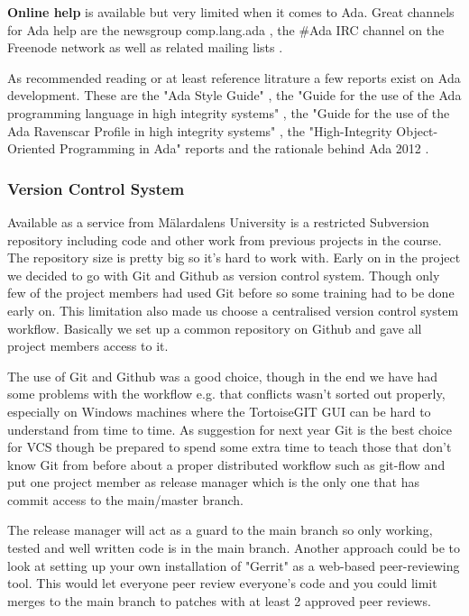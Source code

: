 \textbf{Online help} is available but very limited when it comes to Ada. Great
channels for Ada help are the newsgroup comp.lang.ada \cite{web:comp.lang.ada},
the \#Ada IRC channel on the Freenode network as well as related mailing lists
\cite{web:avr-ada-devel,web:debian-ada-devel}.

As recommended reading or at least reference litrature a few reports
exist on Ada development. These are the "Ada Style Guide" \cite{web:wikibooks-ada-style-guide},
the "Guide for the use of the Ada programming language in high integrity systems"
\cite{web:ada-high-integrity}, the "Guide for the use of the Ada Ravenscar Profile
in high integrity systems" \cite{web:ada-ravenscar-high-integrity}, the "High-Integrity
Object-Oriented Programming in Ada" reports \cite{web:ada-oop-high-integrity} and
the rationale behind Ada 2012 \cite{web:ada-rationale-2012}.

\subsubsection{Version Control System}
Available as a service from M\"{a}lardalens University is a restricted Subversion repository
including code and other work from previous projects in the course. The repository
size is pretty big so it's hard to work with. Early on in the project we decided
to go with Git and Github as version control system. Though only few of the project
members had used Git before so some training had to be done early on. This limitation
also made us choose a centralised version control system workflow. Basically
we set up a common repository on Github \cite{web:github_naiad-auv-software}
and gave all project members access to it.

The use of Git and Github was a good choice, though in the end we have had some
problems with the workflow e.g. that conflicts wasn't sorted out properly, especially
on Windows machines where the TortoiseGIT GUI can be hard to understand from time
to time. As suggestion for next year Git is the best choice for VCS though be prepared to
spend some extra time to teach those that don't know Git from before about a proper
distributed workflow such as git-flow \cite{web:git-flow} and put one project member
as release manager which is the only one that has commit access to the main/master branch.

The release manager will act as a guard to the main branch so only working, tested and
well written code is in the main branch. Another approach could be to look at
setting up your own installation of "Gerrit" \cite{web:gerrit} as a web-based peer-reviewing tool.
This would let everyone peer review everyone's code and you could limit merges
to the main branch to patches with at least 2 approved peer reviews.

